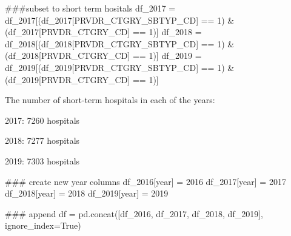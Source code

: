 \documentclass[
  letterpaper,
  DIV=11,
  numbers=noendperiod]{scrartcl}
\newenvironment{Shaded}{\begin{snugshade}}{\end{snugshade}}
\newcommand{\CommentTok}[1]{\textcolor[rgb]{0.37,0.37,0.37}{#1}}
\newcommand{\DecValTok}[1]{\textcolor[rgb]{0.68,0.00,0.00}{#1}}
\newcommand{\NormalTok}[1]{\textcolor[rgb]{0.00,0.23,0.31}{#1}}
\newcommand{\OperatorTok}[1]{\textcolor[rgb]{0.37,0.37,0.37}{#1}}
\newcommand{\StringTok}[1]{\textcolor[rgb]{0.13,0.47,0.30}{#1}}
\newcommand{\VariableTok}[1]{\textcolor[rgb]{0.07,0.07,0.07}{#1}}
\begin{document}
\begin{Shaded}
\begin{Highlighting}[]
\CommentTok{\#\#\#subset to short term hositals}
\NormalTok{df\_2017 }\OperatorTok{=}\NormalTok{ df\_2017[(df\_2017[}\StringTok{\textquotesingle{}PRVDR\_CTGRY\_SBTYP\_CD\textquotesingle{}}\NormalTok{] }\OperatorTok{==} \DecValTok{1}\NormalTok{) }\OperatorTok{\&}\NormalTok{ (df\_2017[}\StringTok{\textquotesingle{}PRVDR\_CTGRY\_CD\textquotesingle{}}\NormalTok{] }\OperatorTok{==} \DecValTok{1}\NormalTok{)]}
\NormalTok{df\_2018 }\OperatorTok{=}\NormalTok{ df\_2018[(df\_2018[}\StringTok{\textquotesingle{}PRVDR\_CTGRY\_SBTYP\_CD\textquotesingle{}}\NormalTok{] }\OperatorTok{==} \DecValTok{1}\NormalTok{) }\OperatorTok{\&}\NormalTok{ (df\_2018[}\StringTok{\textquotesingle{}PRVDR\_CTGRY\_CD\textquotesingle{}}\NormalTok{] }\OperatorTok{==} \DecValTok{1}\NormalTok{)]}
\NormalTok{df\_2019 }\OperatorTok{=}\NormalTok{ df\_2019[(df\_2019[}\StringTok{\textquotesingle{}PRVDR\_CTGRY\_SBTYP\_CD\textquotesingle{}}\NormalTok{] }\OperatorTok{==} \DecValTok{1}\NormalTok{) }\OperatorTok{\&}\NormalTok{ (df\_2019[}\StringTok{\textquotesingle{}PRVDR\_CTGRY\_CD\textquotesingle{}}\NormalTok{] }\OperatorTok{==} \DecValTok{1}\NormalTok{)]}
\end{Highlighting}
\end{Shaded}

The number of short-term hospitals in each of the years:

2017: 7260 hospitals

2018: 7277 hospitals

2019: 7303 hospitals

\begin{Shaded}
\begin{Highlighting}[]
\CommentTok{\#\#\# create new year columns}
\NormalTok{df\_2016[}\StringTok{\textquotesingle{}year\textquotesingle{}}\NormalTok{] }\OperatorTok{=} \DecValTok{2016}
\NormalTok{df\_2017[}\StringTok{\textquotesingle{}year\textquotesingle{}}\NormalTok{] }\OperatorTok{=} \DecValTok{2017}
\NormalTok{df\_2018[}\StringTok{\textquotesingle{}year\textquotesingle{}}\NormalTok{] }\OperatorTok{=} \DecValTok{2018}
\NormalTok{df\_2019[}\StringTok{\textquotesingle{}year\textquotesingle{}}\NormalTok{] }\OperatorTok{=} \DecValTok{2019}

\CommentTok{\#\#\# append}
\NormalTok{df }\OperatorTok{=}\NormalTok{ pd.concat([df\_2016, df\_2017, df\_2018, df\_2019], ignore\_index}\OperatorTok{=}\VariableTok{True}\NormalTok{)}
\end{Highlighting}
\end{Shaded}
\end{document}

